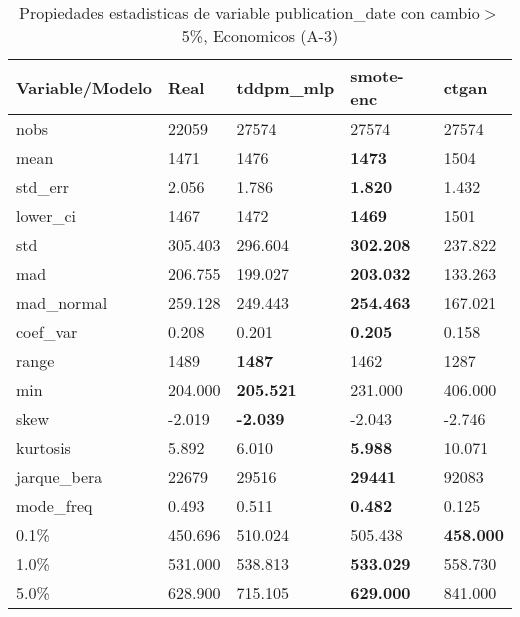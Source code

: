 \begin{table}[H]
\centering
\fontsize{8}{14}\selectfont
\caption{Propiedades estadisticas de variable publication\_date con cambio\ensuremath{>}5\%, Economicos (A-3)}
\label{table-stats-economicos-a-3-publication_date-short}
\begin{tabular}{|l|m{10em}|m{10em}|m{10em}|m{10em}|}
\hline
 \rowcolor[gray]{0.8}
Variable/Modelo & Real & tddpm\_mlp & smote-enc & ctgan \\
\hline nobs & 22059 & 27574 & 27574 & 27574 \\
\hline mean & 1471 & 1476 & \bfseries 1473 & \cellcolor[rgb]{0.9, 0.54, 0.52} 1504 \\
\hline std\_err & 2.056 & 1.786 & \bfseries 1.820 & \cellcolor[rgb]{0.9, 0.54, 0.52} 1.432 \\
\hline lower\_ci & 1467 & 1472 & \bfseries 1469 & \cellcolor[rgb]{0.9, 0.54, 0.52} 1501 \\
\hline std & 305.403 & 296.604 & \bfseries 302.208 & \cellcolor[rgb]{0.9, 0.54, 0.52} 237.822 \\
\hline mad & 206.755 & 199.027 & \bfseries 203.032 & \cellcolor[rgb]{0.9, 0.54, 0.52} 133.263 \\
\hline mad\_normal & 259.128 & 249.443 & \bfseries 254.463 & \cellcolor[rgb]{0.9, 0.54, 0.52} 167.021 \\
\hline coef\_var & 0.208 & 0.201 & \bfseries 0.205 & \cellcolor[rgb]{0.9, 0.54, 0.52} 0.158 \\
\hline range & 1489 & \bfseries 1487 & 1462 & \cellcolor[rgb]{0.9, 0.54, 0.52} 1287 \\
\hline min & 204.000 & \bfseries 205.521 & 231.000 & \cellcolor[rgb]{0.9, 0.54, 0.52} 406.000 \\
\hline skew & -2.019 & \bfseries -2.039 & -2.043 & \cellcolor[rgb]{0.9, 0.54, 0.52} -2.746 \\
\hline kurtosis & 5.892 & 6.010 & \bfseries 5.988 & \cellcolor[rgb]{0.9, 0.54, 0.52} 10.071 \\
\hline jarque\_bera & 22679 & 29516 & \bfseries 29441 & \cellcolor[rgb]{0.9, 0.54, 0.52} 92083 \\
\hline mode\_freq & 0.493 & 0.511 & \bfseries 0.482 & \cellcolor[rgb]{0.9, 0.54, 0.52} 0.125 \\
\hline 0.1\% & 450.696 & \cellcolor[rgb]{0.9, 0.54, 0.52} 510.024 & 505.438 & \bfseries 458.000 \\
\hline 1.0\% & 531.000 & 538.813 & \bfseries 533.029 & \cellcolor[rgb]{0.9, 0.54, 0.52} 558.730 \\
\hline 5.0\% & 628.900 & 715.105 & \bfseries 629.000 & \cellcolor[rgb]{0.9, 0.54, 0.52} 841.000 \\
\hline
\end{tabular}
\end{table}
